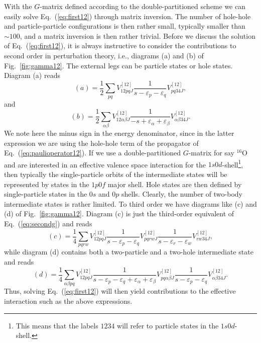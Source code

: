With the $G$-matrix defined according 
to the double-partitioned scheme we can easily solve Eq.\ (\ref{eq:first12})
through matrix inversion. The number of hole-hole and particle-particle
configurations is then rather small, typically smaller than
$\sim  100$, and a matrix inversion
is then rather trivial. 
Before we discuss the solution of Eq.\ (\ref{eq:first12}), it is always
instructive to consider the contributions to second order in 
perturbation theory, i.e., diagrams (a) and (b) of Fig.\
\ref{fig:gamma12}. The external legs can be 
particle states or hole states. Diagram (a) reads
\begin{equation}
      (a)=\frac{1}{2}\sum_{pq}V^{[12]}_{12pq J}
      \frac{1}{s-\varepsilon_p-
                \varepsilon_q} V^{[12]}_{pq34 J},
      \label{eq:secondg}
\end{equation}
and 
\begin{equation}
      (b)=\frac{1}{2}\sum_{\alpha\beta}V^{[12]}_{12\alpha\beta J}
      \frac{1}{-s+\varepsilon_{\alpha}+
                \varepsilon_{\beta}} V^{[12]}_{\alpha\beta 34 J}.
\end{equation}
We note here the minus sign in the energy denominator,
since in the latter expression we are using
the hole-hole term of the propagator of
Eq.\ (\ref{eq:paulioperator12}).
If we use a double-partitioned $G$-matrix for say $^{16}$O and
are interested in an effective valence space interaction
for the $1s0d$-shell\footnote{This means that the labels $1234$ will
refer to particle states in the $1s0d$-shell.}, then typically
the single-particle orbits of the intermediate states will be represented
by states in the $1p0f$ major shell. Hole states are then defined
by single-particle states in the $0s$ and $0p$ shells.
Clearly, the number of two-body intermediate states is rather limited. 
To third order we have diagrams like (c) and (d) of Fig.\
\ref{fig:gamma12}. Diagram (c) is just the third-order equivalent of
Eq.\ (\ref{eq:secondg}) and reads
\begin{equation}
      (c)=\frac{1}{4}\sum_{pqrw}V^{[12]}_{12pq J}
      \frac{1}{s-\varepsilon_p-
                \varepsilon_q} 
      V^{[12]}_{pqrw J}
      \frac{1}{s-\varepsilon_r-
                \varepsilon_w} 
       V^{[12]}_{rw34 J},
      \label{eq:thirdg}
\end{equation}
while diagram (d) contains both a two-particle and a two-hole 
intermediate state and reads
\begin{equation}
      (d)=\frac{1}{4}\sum_{\alpha\beta pq}V^{[12]}_{12pq J}
      \frac{1}{s-\varepsilon_p-
                \varepsilon_q+\varepsilon_{\alpha}+
                \varepsilon_{\beta}} 
      V^{[12]}_{pq\alpha\beta J}
      \frac{1}{s-\varepsilon_p-
                \varepsilon_q} 
       V^{[12]}_{\alpha\beta 34 J}.
      \label{eq:thirdg2h}
\end{equation}
Thus, solving Eq.\ (\ref{eq:first12}) will then
yield contributions to the effective interaction
such as the above expressions. 
 
